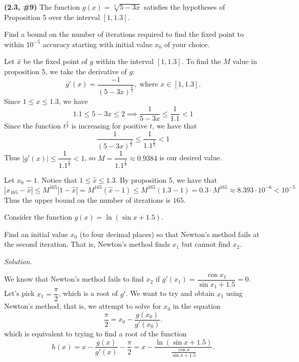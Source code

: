 \documentclass{eh-homework}
\begin{document}
    \newpage
    \begin{question}{2}
    \textbf{(2.3, \#9)} The function \(g(x) = \sqrt[3]{5 - 3x}\) satisfies the hypotheses of Proposition 5 over the interval \([1, 1.3]\).
    
    Find a bound on the number of iterations required to find the fixed point to within \(10^{-5}\) accuracy starting with initial value \(x_0\) of your choice.

    Let \(\hat{x}\) be the fixed point of \(g\) within the interval \([1, 1.3]\). To find the \(M\) value in proposition 5, we take the derivative of \(g\):
    \[
        g'(x) = \frac{-1}{(5-3x)^{\frac{2}{3}}}, \text{ where } x \in [1,1.3].
    \]
    Since \(1 \leq x \leq 1.3\), we have
    \[
        1.1 \leq 5 - 3x \leq 2 \implies \frac{1}{5-3x} \leq \frac{1}{1.1} < 1
    \]
    Since the function \(t^{\frac{2}{3}}\) is increasing for positive \(t\), we have that
    \[
        \frac{1}{(5-3x)^{\frac{2}{3}}} \leq \frac{1}{1.1^{\frac{2}{3}}} < 1
    \]
    Thus \(|g'(x)| \leq \dfrac{1}{1.1^{\frac{2}{3}}} < 1\), so \(M = \dfrac{1}{1.1^{\frac{2}{3}}} \approx 0.9384\) is our desired value.

    Let \(x_0 = 1\). Notice that \(1 \leq \hat{x} \leq 1.3\). By proposition 5, we have that
    \[
        |x_{165} - \hat{x}| \leq M^{165} |1 - \hat{x}| = M^{165} (\hat{x} - 1) \leq M^{165} (1.3 - 1) = 0.3 \cdot M^{165} \approx 8.393 \cdot 10^{-6} < 10^{-5}
    \]
    Thus the upper bound on the number of iterations is \(165\).

    \end{question}
    \newpage
    \begin{question}{3}
    Consider the function \(g(x) = \ln(\sin x + 1.5)\).
    
    Find an initial value \(x_0\) (to four decimal places) so that Newton’s method fails at the second iteration. That is, Newton’s method finds \(x_1\) but cannot find \(x_2\).

    \textit{Solution.}
    
    We know that Newton's method fails to find \(x_2\) if \(g'(x_1) = \dfrac{\cos x_1}{\sin x_1 + 1.5} = 0\). Let's pick \(x_1 = \dfrac{\pi}{2}\), which is a root of \(g'\). We want to try and obtain \(x_1\) using Newton's method, that is, we attempt to solve for \(x_0\) in the equation
    \[
        \frac{\pi}{2} = x_0 - \frac{g(x_0)}{g'(x_0)}.
    \]
    which is equivalent to trying to find a root of the function
    \[
        h(x) = x - \dfrac{g(x)}{g'(x)} - \dfrac{\pi}{2} = x - \frac{\ln (\sin x + 1.5)}{\frac{\cos x}{\sin x + 1.5}}.
    \]

    \end{question}
\end{document}
